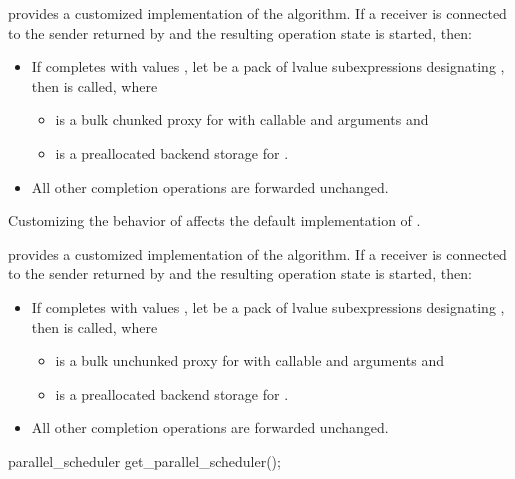 \pnum
{} provides a customized implementation of
the  algorithm.
If a receiver  is connected to the sender
returned by  and
the resulting operation state is started, then:
\begin{itemize}
\item
If  completes with values ,
let  be a pack of lvalue subexpressions designating ,
then  is called, where
\begin{itemize}
\item
{} is a bulk chunked proxy for 
with callable  and arguments  and
\item
{} is a preallocated backend storage for .
\end{itemize}
\item
All other completion operations are forwarded unchanged.
\end{itemize}
\begin{note}
Customizing the behavior of 
affects the default implementation of .
\end{note}

\pnum
{} provides a customized implementation of
the  algorithm.
If a receiver  is connected to the sender
returned by  and
the resulting operation state is started, then:
\begin{itemize}
\item
If  completes with values ,
let  be a pack of lvalue subexpressions designating ,
then  is called, where
\begin{itemize}
\item
{} is a bulk unchunked proxy for 
with callable  and arguments  and
\item
{} is a preallocated backend storage for .
\end{itemize}
\item
All other completion operations are forwarded unchanged.
\end{itemize}

%
\begin{itemdecl}
parallel_scheduler get_parallel_scheduler();
\end{itemdecl}

